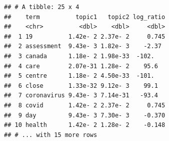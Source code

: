 \documentclass[]{article}
\newenvironment{Shaded}{\begin{snugshade}}{\end{snugshade}}
\newcommand{\CommentTok}[1]{\textcolor[rgb]{0.56,0.35,0.01}{\textit{#1}}}
\newcommand{\DataTypeTok}[1]{\textcolor[rgb]{0.13,0.29,0.53}{#1}}
\newcommand{\FloatTok}[1]{\textcolor[rgb]{0.00,0.00,0.81}{#1}}
\newcommand{\KeywordTok}[1]{\textcolor[rgb]{0.13,0.29,0.53}{\textbf{#1}}}
\newcommand{\NormalTok}[1]{#1}
\newcommand{\OperatorTok}[1]{\textcolor[rgb]{0.81,0.36,0.00}{\textbf{#1}}}
\newcommand{\OtherTok}[1]{\textcolor[rgb]{0.56,0.35,0.01}{#1}}
\newcommand{\StringTok}[1]{\textcolor[rgb]{0.31,0.60,0.02}{#1}}
\begin{document}
\begin{Shaded}
\end{Shaded}

\begin{verbatim}
## # A tibble: 25 x 4
##    term          topic1   topic2 log_ratio
##    <chr>          <dbl>    <dbl>     <dbl>
##  1 19          1.42e- 2 2.37e- 2     0.745
##  2 assessment  9.43e- 3 1.82e- 3    -2.37 
##  3 canada      1.18e- 2 1.98e-33  -102.   
##  4 care        2.07e-31 1.28e- 2    95.6  
##  5 centre      1.18e- 2 4.50e-33  -101.   
##  6 close       1.33e-32 9.12e- 3    99.1  
##  7 coronavirus 9.43e- 3 7.14e-31   -93.4  
##  8 covid       1.42e- 2 2.37e- 2     0.745
##  9 day         9.43e- 3 7.30e- 3    -0.370
## 10 health      1.42e- 2 1.28e- 2    -0.148
## # ... with 15 more rows
\end{verbatim}

\begin{Shaded}
\end{Shaded}
\end{document}

